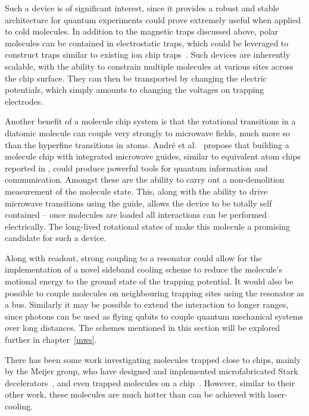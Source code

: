 Such a device is of significant interest, since it provides a robust and stable architecture for quantum experiments could
prove extremely useful when applied to cold molecules. In addition to the
magnetic traps discussed above, polar molecules can be
contained in electrostatic traps, which could be leveraged to construct traps
similar to existing ion chip traps~\cite{Andre2006, Romaszko2020}. Such devices
are inherently scalable, with the ability to constrain multiple molecules at
various sites across the chip surface. They can then be transported by changing
the electric potentials, which simply amounts to changing the voltages on
trapping electrodes.

Another benefit of a molecule chip system is that the rotational transitions in
a diatomic molecule can couple very strongly to microwave fields, much more so
than the hyperfine transitions in atoms. Andr\'e et al.~\cite{Andre2006}
propose that building a molecule chip with integrated microwave guides, similar
to equivalent atom chips reported in , could
produce powerful tools for quantum information and communication. Amongst these
are the ability to carry out a non-demolition measurement of the molecule
state. This, along with the ability to drive microwave transitions using the
guide, allows the device to be totally self contained -- once molecules are
loaded all interactions can be performed electrically. The long-lived
rotational states of \CaF{} make this molecule a promising candidate for such a
device.

Along with readout, strong coupling to a resonator could allow for the
implementation of a novel sideband cooling scheme to reduce the molecule's
motional energy to the ground state of the trapping potential. It would also be
possible to couple molecules on neighbouring trapping sites using the resonator as a bus.
Similarly it may be possible to extend the interaction to longer ranges, since
photons can be used as flying qubits to couple quantum mechanical systems over
long distances. The schemes mentioned in this section will be explored further
in chapter~\ref{mws}.

There has been some work investigating molecules trapped close to chips, mainly by
the Meijer group, who have designed and implemented microfabricated Stark
decelerators~\cite{Meek2008}, and even trapped molecules on a
chip~\cite{Meek2009}. However, similar to their other work, these molecules are
much hotter than can be achieved with laser-cooling.

